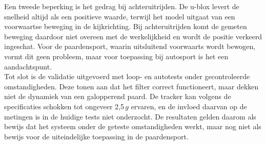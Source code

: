 Een tweede beperking is het gedrag bij achteruitrijden. De u-blox levert de snelheid altijd als een positieve waarde, terwijl het model uitgaat van een voorwaartse beweging in de kijkrichting. Bij achteruitrijden komt de gemeten beweging daardoor niet overeen met de werkelijkheid en wordt de positie verkeerd ingeschat. Voor de paardensport, waarin uitsluitend voorwaarts wordt bewogen, vormt dit geen probleem, maar voor toepassing bij autosport is het een aandachtspunt. \\

Tot slot is de validatie uitgevoerd met loop- en autotests onder gecontroleerde 
omstandigheden. Deze tonen aan dat het filter correct functioneert, maar dekken niet de dynamiek van een galopperend paard. De tracker kan volgens de specificaties schokken tot ongeveer 2,5\,$g$ ervaren, en de invloed daarvan op de metingen is in de huidige tests niet onderzocht. De resultaten gelden daarom als bewijs dat het systeem onder de geteste omstandigheden werkt, maar nog niet als bewijs voor de uiteindelijke toepassing in de paardensport.


\newpage